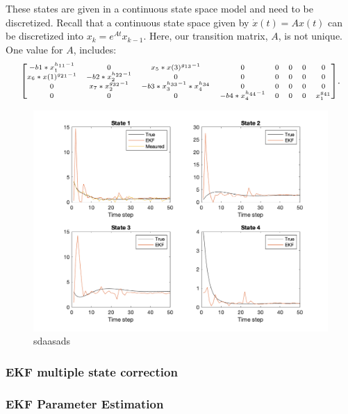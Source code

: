 \noindent These states are given in a continuous state space model and need to be discretized. Recall that a continuous state space given by $\dot x(t) = Ax(t)$ can be discretized into $x_k = e^{At}x_{k-1}$. Here, our transition matrix, $A$, is not unique. One value for $A$, includes:
$$
\scriptsize{
\begin{bmatrix}
-b1*x_1^{h_{11}-1} & 0 & x_5*x(3)^{g_{13}-1}& 0 & 0  & 0 & 0  & 0 \\
x_6*x(1)^{g_{21}-1} & -b2*x_2^{h_{22}-1}&0&0&0&0&0&0 \\
0&x_7*x_2^{g_{32}-1}&-b3*x_3^{h_{33}-1}*x_4^{h_{34}}&0&0&0&0&0\\
0&0&0&-b4*x_4^{h_{44}-1}&0&0&0&x_1^{g_{41}}\\
\end{bmatrix}}.
$$


\begin{figure}[h]
    \centering
    \includegraphics[scale = 0.6]{EKF_1_state.png}
    \caption{sdaasads}
\end{figure}

\subsubsection{EKF multiple state correction}

\subsubsection{EKF Parameter Estimation}

